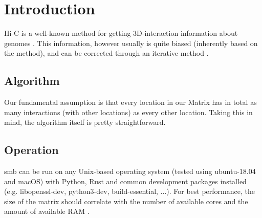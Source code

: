 \chapter{Introduction}\label{chap:introduction}

Hi-C is a well-known method for getting 3D-interaction information about genomes \cite{wingett2015hicup}. This information, however usually is quite biased (inherently based on the method), and can be corrected through an iterative method \cite{imakaev2012iterative}.


\section{Algorithm}
Our fundamental assumption is that every location in our Matrix has in total as
many interactions (with other locations) as every other location.
Taking this in mind, the algorithm itself is pretty straightforward.


\section{Operation}
smb can be run on any Unix-based operating system (tested using ubuntu-18.04
and macOS) with Python, Rust and common development packages installed (e.g.
libopenssl-dev, python3-dev, build-essential, ...). For best performance, the
size of the matrix should correlate with the number of available cores and the
amount of available RAM .







